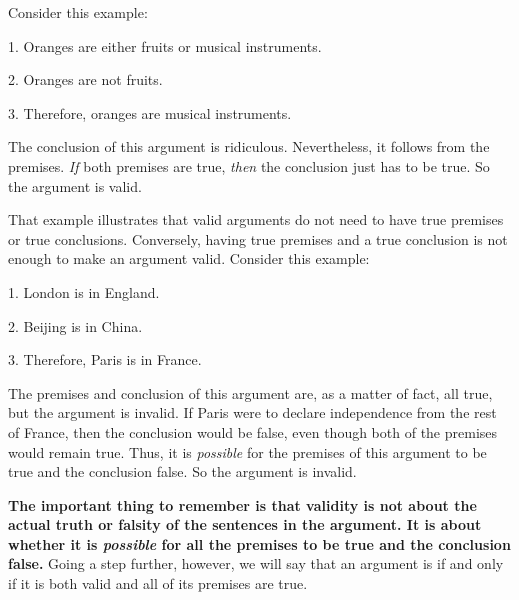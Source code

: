        
Consider this example:
	\begin{earg}
		\item[1.] Oranges are either fruits or musical instruments.
		\item[2.] Oranges are not fruits.
		\item[3.] Therefore, oranges are musical instruments.
	\end{earg}
The conclusion of this argument is ridiculous. Nevertheless, it follows from the premises. \emph{If} both premises are true, \emph{then} the conclusion just has to be true. So the argument is valid. 

That example illustrates that valid arguments do not need to have true premises or true conclusions. Conversely, having true premises and a true conclusion is not enough to make an argument valid. Consider this example:
	\begin{earg}
		\item[1.] London is in England.
		\item[2.] Beijing is in China.
		\item[3.] Therefore, Paris is in France.
	\end{earg}
The premises and conclusion of this argument are, as a matter of fact, all true, but the argument is invalid. If Paris were to declare independence from the rest of France, then the conclusion would be false, even though both of the premises would remain true. Thus, it is \emph{possible} for the premises of this argument to be true and the conclusion false. So the argument is invalid.

\textbf{The important thing to remember is that validity is not about the actual truth or falsity of the sentences in the argument. It is about whether it is \emph{possible} for all the premises to be true and the conclusion false.} Going a step further, however, we will say that an argument is \label{def-sound-arg} if and only if it is both valid and all of its premises are true.


